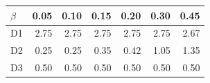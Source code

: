 \begin{tabular}{lrrrrrr}
\toprule
$\beta$ & 0.05 & 0.10 & 0.15 & 0.20 & 0.30 & 0.45 \\
\midrule
D1 & 2.75 & 2.75 & 2.75 & 2.75 & 2.75 & 2.67 \\
D2 & 0.25 & 0.25 & 0.35 & 0.42 & 1.05 & 1.35 \\
D3 & 0.50 & 0.50 & 0.50 & 0.50 & 0.50 & 0.50 \\
\bottomrule
\end{tabular}